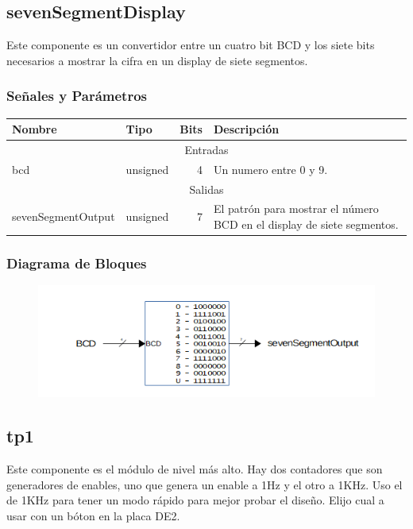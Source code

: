 \documentclass[a4paper]{article}
\begin{document}
\subsection{sevenSegmentDisplay}

Este componente es un convertidor entre un cuatro bit BCD y los siete bits necesarios a mostrar la cifra en un display de siete segmentos.

\subsubsection{Señales y Parámetros}

\begin{tabular}{| l | l | r | p{8cm} |}
\hline
\textbf{Nombre} & \textbf{Tipo} & \textbf{Bits} & \textbf{Descripción} \\ \hline
\multicolumn{4}{|c|}{Entradas} \\ \hline
bcd & unsigned & 4 & Un numero entre 0 y 9. \\ \hline
\multicolumn{4}{|c|}{Salidas} \\ \hline
sevenSegmentOutput & unsigned & 7 & El patrón para mostrar el número BCD en el display de siete segmentos. \\ \hline
\end{tabular}

\subsubsection{Diagrama de Bloques}

\begin{figure}[!h]
\includegraphics[width=15cm]{img/sevenSegmentDisplay_bloque.png}
\end{figure}

\subsection{tp1}

Este componente es el módulo de nivel más alto. Hay dos contadores que son generadores de enables, uno que genera un enable a 1Hz y el otro a 1KHz. Uso el de 1KHz para tener un modo rápido para mejor probar el diseño. Elijo cual a usar con un bóton en la placa DE2.
\end{document}
